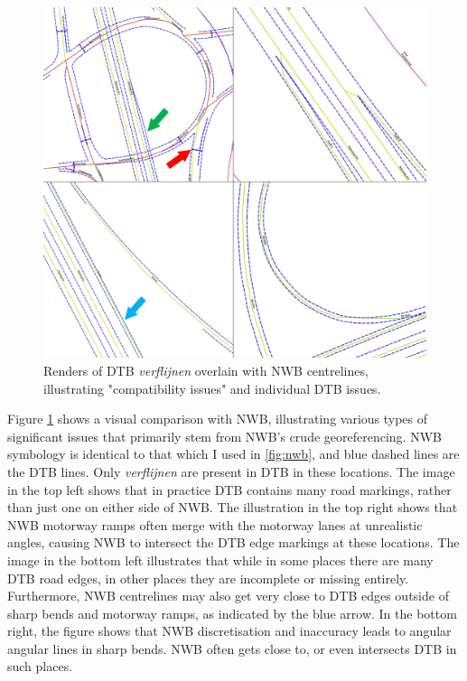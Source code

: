 \begin{figure}
    \centering
    \includegraphics[width=0.95\linewidth]{final_report/figs/dtb_sample_07.png} 
    \caption{Renders of DTB \textit{verflijnen} overlain with NWB centrelines, illustrating "compatibility issues" and individual DTB issues.}
    \label{fig:dtbnwb}
\end{figure}

Figure \ref{fig:dtbnwb} shows a visual comparison with NWB, illustrating various types of significant issues that primarily stem from NWB's crude georeferencing. NWB symbology is identical to that which I used in \ref{fig:nwb}, and blue dashed lines are the DTB lines. Only \textit{verflijnen} are present in DTB in these locations. The image in the top left shows that in practice DTB contains many road markings, rather than just one on either side of NWB. The illustration in the top right shows that NWB motorway ramps often merge with the motorway lanes at unrealistic angles, causing NWB to intersect the DTB edge markings at these locations. The image in the bottom left illustrates that while in some places there are many DTB road edges, in other places they are incomplete or missing entirely. Furthermore, NWB centrelines may also get very close to DTB edges outside of sharp bends and motorway ramps, as indicated by the blue arrow. In the bottom right, the figure shows that NWB discretisation and inaccuracy leads to angular angular lines in sharp bends. NWB often gets close to, or even intersects DTB in such places.

